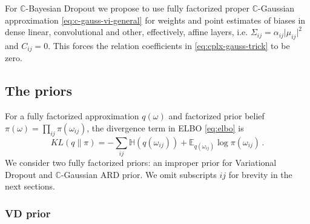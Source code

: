 \documentclass[a4paper,10pt,onecolumn]{article}
\newcommand{\cplx}{\mathbb{C}}
\begin{document}
For $\cplx$-Bayesian Dropout we propose to use fully factorized proper $\cplx$-Gaussian
approximation \eqref{eq:c-gauss-vi-general} for weights and point estimates of biases in
dense linear, convolutional and other, effectively, affine layers, i.e. $
  \Sigma_{ij} = \alpha_{ij} \lvert \mu_{ij} \rvert^2
$ and $C_{ij} = 0$. This forces the relation coefficients in \eqref{eq:cplx-gauss-trick}
to be zero.


\subsection{The priors} %
\label{sub:the_priors}

For a fully factorized approximation $q(\omega)$ and factorized prior belief $
  \pi(\omega) = \prod_{ij} \pi(\omega_{ij})
$, the divergence term in ELBO \eqref{eq:elbo} is
\begin{equation}  \label{eq:elbo-general-kl-div}
  KL(q \| \pi)
    = - \sum_{ij}
        \mathbb{H}(q(\omega_{ij}))
        + \mathbb{E}_{q(\omega_{ij})} \log{\pi(\omega_{ij})}
    \,.
\end{equation}
We consider two fully factorized priors: an improper prior for Variational Dropout and
$\cplx$-Gaussian ARD prior. We omit subscripts ${ij}$ for brevity in the next sections.

\subsubsection{VD prior} %
\label{ssub:vd_prior}
\end{document}
